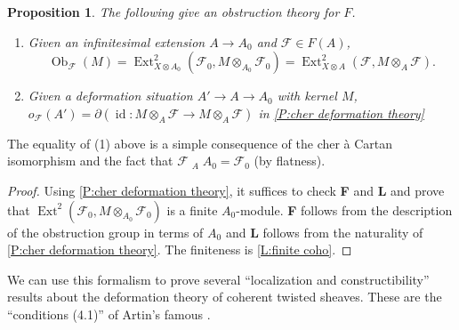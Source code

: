 \documentclass[11pt]{amsart}
\newcommand{\field}[1]{\mathbf #1}
\newcommand{\ms}[1]{\mathscr #1}
\DeclareMathOperator{\ob}{\operatorname{Ob}}
\DeclareMathOperator{\ext}{\operatorname{Ext}}
\renewcommand{\[}{[\!\hspace{0.03em}[}
\renewcommand{\]}{]\!\hspace{0.03em}]}
\renewcommand{\(}{(\!\hspace{0.03em}(}
\renewcommand{\)}{)\!\hspace{0.03em})}
\DeclareMathOperator*{\tensor}{\otimes}
\DeclareMathOperator*{\ltensor}{\stackrel{\field L}{\otimes}}
\newcommand{\id}{\operatorname{id}}
\newtheorem{prop}[lem]{Proposition}
\theoremstyle{definition}
\theoremstyle{remark}
\begin{document}
\begin{prop} The following give an obstruction theory for $F$. 
    \begin{enumerate}
	\item Given an infinitesimal extension $A\to A_{0}$ and $\ms F\in 
	F(A)$, $$\ob_{\ms F}(M)=\ext^{2}_{X\tensor A_{0}}(\ms 
	F_{0},M\tensor_{A_{0}}\ms F_{0})=\ext^{2}_{X\tensor A}(\ms 
	F,M\tensor_{A}\ms F).$$
    
	\item Given a deformation situation $A'\to A\to A_{0}$ with 
	kernel $M$, $o_{\ms F}(A')=\partial(\id:M\tensor_{A}\ms F\to 
	M\tensor_{A}\ms F)$ in \ref{P:cher deformation theory}
    \end{enumerate}
\end{prop}
The equality of (1) above is a simple consequence of the cher \`a 
Cartan isomorphism and the fact that $\ms F\ltensor_{A}A_{0}=\ms 
F_{0}$ (by flatness).
\begin{proof} Using \ref{P:cher deformation theory}, it suffices to 
check {\bf F} and {\bf L} and prove that $\ext^{2}(\ms 
F_{0},M\tensor_{A_{0}}\ms F_{0})$ is a finite $A_{0}$-module.  {\bf F} follows from the 
description of the obstruction group in terms of $A_{0}$ and {\bf L} 
follows from the naturality of \ref{P:cher deformation theory}.  The 
finiteness is \ref{L:finite coho}.  
\end{proof}

We can use this formalism to prove several ``localization and constructibility'' 
results about the deformation theory of coherent twisted sheaves.  
These are the ``conditions (4.1)'' of Artin's famous \cite{artin}.  
\end{document}
